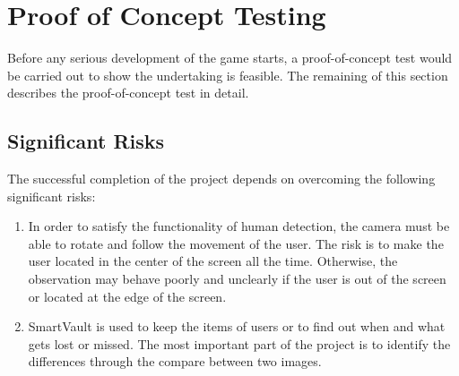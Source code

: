 \documentclass[12pt, titlepage]{article}
\begin{document}
\section{Proof of Concept Testing}
Before any serious development of the game starts, a proof-of-concept test would be carried out to show the undertaking is feasible. The remaining of this section describes the proof-of-concept test in detail.

\subsection{Significant Risks}
The successful completion of the project depends on overcoming the following significant risks:
\begin{enumerate}
\item{}
In order to satisfy the functionality of human detection, the camera must be able to rotate and follow the movement of the user. The risk is to make the user located in the center of the screen all the time. Otherwise, the observation may behave poorly and unclearly if the user is out of the screen or located at the edge of the screen.			
\item{}
SmartVault is used to keep the items of users or to find out when and what gets lost or missed. The most important part of the project is to identify the differences through the compare between two images.
\end{enumerate}
\end{document}
